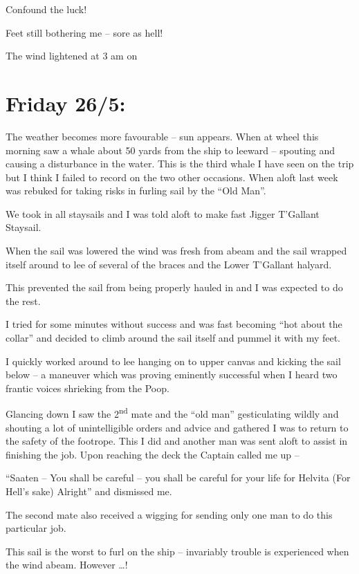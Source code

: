 \documentclass[
  11pt,
  msmallroyalvopaper
]{memoir}
\begin{document}
Confound the luck!

Feet still bothering me -- sore as hell!

The wind lightened at 3 am on

\hypertarget{friday-265}{%
\section{Friday 26/5:}\label{friday-265}}

The weather becomes more favourable -- sun appears. When at wheel this
morning saw a whale about 50 yards from the ship to leeward -- spouting
and causing a disturbance in the water. This is the third whale I have
seen on the trip but I think I failed to record on the two other
occasions. When aloft last week was rebuked for taking risks in furling
sail by the ``Old Man''.

We took in all staysails and I was told aloft to make fast Jigger
T'Gallant Staysail.

When the sail was lowered the wind was fresh from abeam and the sail
wrapped itself around to lee of several of the braces and the Lower
T'Gallant halyard.

This prevented the sail from being properly hauled in and I was expected
to do the rest.

I tried for some minutes without success and was fast becoming ``hot
about the collar'' and decided to climb around the sail itself and
pummel it with my feet.

I quickly worked around to lee hanging on to upper canvas and kicking
the sail below -- a maneuver which was proving eminently successful when
I heard two frantic voices shrieking from the Poop.

Glancing down I saw the 2\textsuperscript{nd} mate and the ``old man''
gesticulating wildly and shouting a lot of unintelligible orders and
advice and gathered I was to return to the safety of the footrope. This
I did and another man was sent aloft to assist in finishing the job.
Upon reaching the deck the Captain called me up --

``Saaten -- You shall be careful -- you shall be careful for your life
for Helvita (For Hell's sake) Alright'' and dismissed me.

The second mate also received a wigging for sending only one man to do
this particular job.

This sail is the worst to furl on the ship -- invariably trouble is
experienced when the wind abeam. However \ldots!
\end{document}
